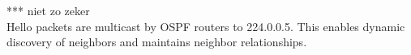 *** niet zo zeker \\
Hello packets are multicast by OSPF routers to  224.0.0.5. This enables dynamic discovery of neighbors and maintains neighbor relationships.
